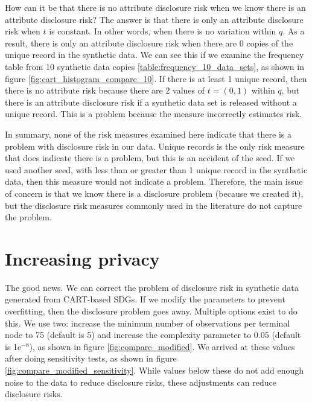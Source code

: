 \documentclass[runningheads]{llncs}
\begin{document}
How can it be that there is no attribute disclosure risk when we know there is an attribute disclosure risk?  The answer is that there is only an attribute disclosure risk when $t$ is constant.  In other words, when there is no variation within $q$.  As a result, there is only an attribute disclosure risk when there are 0 copies of the unique record in the synthetic data.  We can see this if we examine the frequency table from 10 synthetic data copies \ref{table:frequency_10_data_sets}, as shown in figure \ref{fig:cart_histogram_compare_10}.  If there is at least 1 unique record, then there is no attribute risk because there are 2 values of $t=(0,1)$ within $q$, but there is an attribute disclosure risk if a synthetic data set is released without a unique record.  This is a problem because the measure incorrectly estimates risk.

In summary, none of the risk measures examined here indicate that there is a problem with disclosure risk in our data.  Unique records is the only risk measure that does indicate there is a problem, but this is an accident of the seed.  If we used another seed, with less than or greater than 1 unique record in the synthetic data, then this measure would not indicate a problem.  Therefore, the main issue of concern is that we know there is a disclosure problem (because we created it), but the disclosure risk measures commonly used in the literature do not capture the problem.  

\section{Increasing privacy}

The good news.  We can correct the problem of disclosure risk in synthetic data generated from CART-based SDGs.  If we modify the parameters to prevent overfitting, then the disclosure problem goes away.  Multiple options exist to do this.  We use two: increase the minimum number of observations per terminal node to 75 (default is 5) and increase the complexity parameter to 0.05 (default is 1e$^{-8}$), as shown in figure \ref{fig:compare_modified}.  We arrived at these values after doing sensitivity tests, as shown in figure \ref{fig:compare_modified_sensitivity}.  While values below these do not add enough noise to the data to reduce disclosure risks, these adjustments can reduce disclosure risks.
\end{document}

